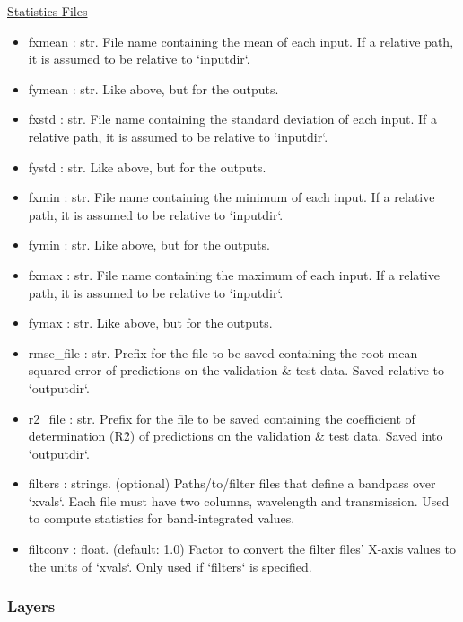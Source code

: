 \documentclass[letterpaper, 12pt]{article}
\begin{document}
\noindent \underline{Statistics Files}
\begin{itemize}
\item fxmean      : str.  File name containing the mean of each input.
                         If a relative path, it is assumed to be relative to `inputdir`.
\item fymean : str. Like above, but for the outputs.
\item fxstd     : str.  File name containing the standard deviation of each 
                   input.  If a relative path, it is assumed to be relative to `inputdir`.
\item fystd : str. Like above, but for the outputs.
\item fxmin : str.  File name containing the minimum of each input.
                         If a relative path, it is assumed to be relative to `inputdir`.
\item fymin : str. Like above, but for the outputs.
\item fxmax : str.  File name containing the maximum of each input.
                         If a relative path, it is assumed to be relative to `inputdir`.
\item fymax : str. Like above, but for the outputs.
\item rmse\_file  : str.  Prefix for the file to be saved containing the root mean 
                   squared error of predictions on the validation \& test data.
                   Saved relative to `outputdir`.
\item r2\_file    : str.  Prefix for the file to be saved containing the 
                   coefficient of determination (R\^2) of predictions on the 
                   validation \& test data.
                   Saved into `outputdir`.
\item filters : strings. (optional) Paths/to/filter files that define a 
                   bandpass over `xvals`. 
                   Each file must have two columns, wavelength and transmission.
                   Used to compute statistics for band-integrated values.
\item filtconv : float. (default: 1.0) Factor to convert the filter files' 
                       X-axis values to the units of `xvals`. 
                       Only used if `filters` is specified.
\end{itemize}

\subsubsection{Layers}
\label{sec:layers}
\end{document}
